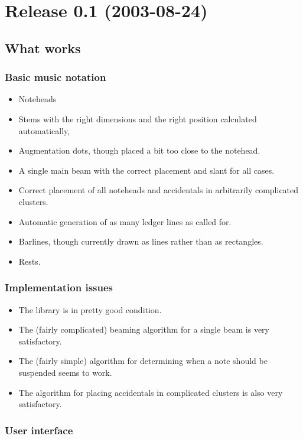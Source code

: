 \section{Release 0.1 (2003-08-24)}

\subsection{What works}

\subsubsection{Basic music notation}

\begin{itemize}
\item Noteheads
\item Stems with the right dimensions and the right position
  calculated automatically, 
\item Augmentation dots, though placed a bit too close to the
  notehead. 
\item A single main beam with the correct placement and slant for all
  cases. 
\item Correct placement of all noteheads and accidentals in
  arbitrarily complicated clusters. 
\item Automatic generation of as many ledger lines as called for.
\item Barlines, though currently drawn as lines rather than as
  rectangles. 
\item Rests.
\end{itemize}

\subsubsection{Implementation issues}

\begin{itemize}
\item The {\obseq} library is in pretty good condition.
\item The (fairly complicated) beaming algorithm for a single beam is very satisfactory.
\item The (fairly simple) algorithm for determining when a note should
  be suspended seems to work. 
\item The algorithm for placing accidentals in complicated clusters is
  also very satisfactory.
\end{itemize}

\subsubsection{User interface}

